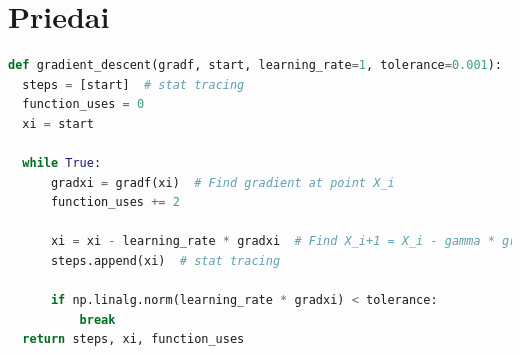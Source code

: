 \documentclass{VUMIFPSkursinis}
\begin{document}
\begin{table}[H]
  \centering
  \caption{Rezultatų palyginimas taške $(0, 0.6)$.}
  \label{table:compar-69}
\end{table}

\section{Priedai}

\begin{lstlisting}[language=Python,caption={Gradientinio nusileidimo algoritmo realizacija su Python},label={code:grad-des}]
  def gradient_descent(gradf, start, learning_rate=1, tolerance=0.001):
  steps = [start]  # stat tracing
  function_uses = 0
  xi = start

  while True:
      gradxi = gradf(xi)  # Find gradient at point X_i
      function_uses += 2

      xi = xi - learning_rate * gradxi  # Find X_i+1 = X_i - gamma * gradf(X_i)
      steps.append(xi)  # stat tracing

      if np.linalg.norm(learning_rate * gradxi) < tolerance:
          break
  return steps, xi, function_uses
\end{lstlisting}
\end{document}
